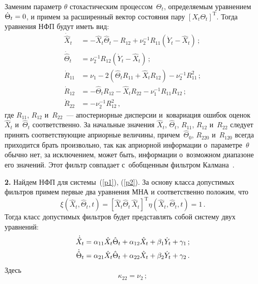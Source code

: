 \begin{multicols}{2}
{ Заменим параметр  $\theta$ стохастическим процессом~$\Theta_t$,
 определяемым уравнением  $\dot \Theta_t\hm=0$, и примем за расширенный
 вектор состояния пару  $\left[ X_t \Theta_t\right]^{\mathrm{T}}$. Тогда уравнения
 НФП будут иметь вид:
   \begin{align*}
   \dot{\hat{X}}_t&=-\hat {X}_t\hat
    \Theta_t - R_{12} +\nu_2^{-1} R_{11} \left(\dot {Y}_t-\hat {X}_t\right)\,;\\
    \dot{\hat {\Theta}}_t &=\nu_2^{-1} R_{12} \left(\dot{Y}_t- \hat{X}_t\right)\,; %
    \\
\dot R_{11} &= \nu_1 - 2\left(\hat {\Theta}_t R_{11} +\hat X_t R_{12}\right)
    -\nu_2^{-1} R_{11}^2\,; %
    \\
\dot R_{12} &=- \hat {\Theta}_t
    R_{12} -\hat{X}_t R_{22} -\nu_1^{-1} R_{11} R_{12}\,; \\
    \dot{R}_{22} &=-\nu_2^{-1} R_{12}^2\,, %
    \end{align*}
где  $R_{11}$, $R_{12}$ и~$R_{22}$~--- апостериорные дисперсии и~ковариация ошибок оценок~$\hat{X}_t$ и~$\hat{\Theta}_t$
соответственно. За начальные значения  $\hat{X}_t$,
$\hat{\Theta}_t$, $R_{11}$, $R_{12}$ и~$R_{22}$ следует принять
соответствующие априорные величины, причем~$\hat{\Theta}_0$,
$R_{220}$ и~$R_{120}$ всегда приходится брать произвольно, так как
априорной информации о~параметре~$\theta$ обычно нет, за
исключением, может быть, информации о~возможном диапазоне его значений.
Этот фильтр совпадает с~обобщенным фильтром Калмана~\cite{1-sin, 6-sin, 8-sin}.

\smallskip

\textbf{2.}  Найдем НФП для системы~(\ref{p1}), (\ref{p2}).
За основу класса допустимых фильтров примем первые два уравнения
МНА и соответственно положим, что
\begin{equation*}
    \xi \left(\hat X_t, \hat \Theta_t, t\right) =
    \left[ \hat X_t \hat \Theta_t\, \hat X_t\right] ^{\mathrm{T}} \eta \left(
    \hat X_t, \hat \Theta_t, t\right)=1\,.
    \end{equation*}
Тогда класс допустимых фильтров
будет представлять собой систему двух уравнений:
\begin{align*}
   \dot{\hat{X}}_t &= \alp_{11} \hat{X}_t \hat\Theta_t +\alp_{12} \hat{X}_t +\beta_1 \dot Y_t +\gamma_1\,; %
   \\
   \dot{\hat\Theta}_t &= \alp_{21} \hat{X}_t \hat\Theta_t +\alp_{22} \hat{X}_t +\beta_2 \dot Y_t +\gamma_2\,. %
   \end{align*}
Здесь
    \begin{equation*}
    \kappa_{22} =\nu_2\,; %
    \end{equation*}

}
\end{multicols}

